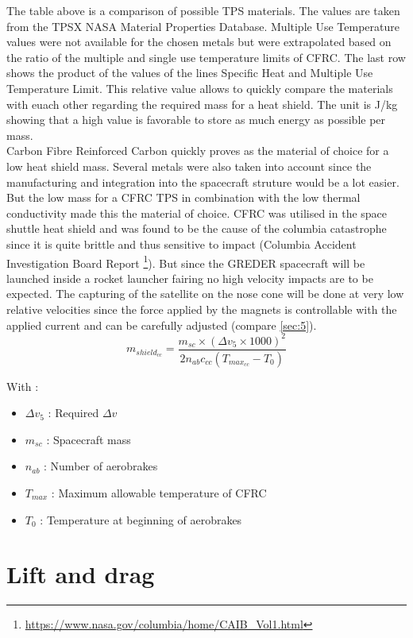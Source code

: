 The table above is a comparison of possible TPS materials. The values are taken from the TPSX NASA Material Properties Database. Multiple Use Temperature values were not available for the chosen metals but were extrapolated based on the ratio of the multiple and single use temperature limits of CFRC. The last row shows the product of the values of the lines Specific Heat and Multiple Use Temperature Limit. This relative value allows to quickly compare the materials with euach other regarding the required mass for a heat shield. The unit is J/kg showing that a high value is favorable to store as much energy as possible per mass.\\

Carbon Fibre Reinforced Carbon quickly proves as the material of choice for a low heat shield mass. Several metals were also taken into account since the manufacturing and integration into the spacecraft struture would be a lot easier. But the low mass for a CFRC TPS in combination with the low thermal conductivity made this the material of choice. CFRC was utilised in the space shuttle heat shield and was found to be the cause of the columbia catastrophe since it is quite brittle and thus sensitive to impact (Columbia Accident Investigation Board Report \footnote{\url{https://www.nasa.gov/columbia/home/CAIB\_Vol1.html}}). But since the GREDER spacecraft will be launched inside a rocket launcher fairing no high velocity impacts are to be expected. The capturing of the satellite on the nose cone will be done at very low relative velocities since the force applied by the magnets is controllable with the applied current and can be carefully adjusted (compare \autoref{sec:5}).
\begin{equation}
	m_{shield_{cc}}= \frac{m_{sc} \times (\Delta v_5\times 1000)^2}{2n_{ab}c_{cc}(T_{max_{cc}}-T_0)}
\end{equation}

With :
\begin{itemize}
	\item $\Delta v_5$ : Required $\Delta v$
	\item $m_{sc}$ : Spacecraft mass
	\item $n_{ab}$ : Number of aerobrakes
	\item $T_{max}$ : Maximum allowable temperature of CFRC
	\item $T_0$ : Temperature at beginning of aerobrakes
\end{itemize}

\section{Lift and drag}

